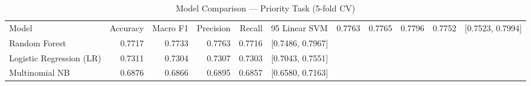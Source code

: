 \begin{table}
\caption{Model Comparison — Priority Task (5-fold CV)}
\label{tab:results_priority}
\begin{tabular}{lrrrrl}
\toprule
Model & Accuracy & Macro F1 & Precision & Recall & 95%
\midrule
Linear SVM & 0.7763 & 0.7765 & 0.7796 & 0.7752 & [0.7523, 0.7994] \\
Random Forest & 0.7717 & 0.7733 & 0.7763 & 0.7716 & [0.7486, 0.7967] \\
Logistic Regression (LR) & 0.7311 & 0.7304 & 0.7307 & 0.7303 & [0.7043, 0.7551] \\
Multinomial NB & 0.6876 & 0.6866 & 0.6895 & 0.6857 & [0.6580, 0.7163] \\
\bottomrule
\end{tabular}
\end{table}

